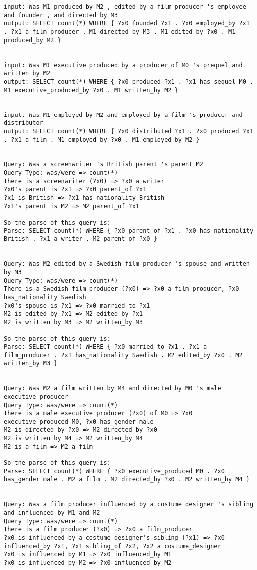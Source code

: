 \documentclass{article} \usepackage{iclr2022_conference,times}
\begin{document}
\begin{lstlisting}
input: Was M1 produced by M2 , edited by a film producer 's employee and founder , and directed by M3
output: SELECT count(*) WHERE { ?x0 founded ?x1 . ?x0 employed_by ?x1 . ?x1 a film_producer . M1 directed_by M3 . M1 edited_by ?x0 . M1 produced_by M2 }


input: Was M1 executive produced by a producer of M0 's prequel and written by M2
output: SELECT count(*) WHERE { ?x0 produced ?x1 . ?x1 has_sequel M0 . M1 executive_produced_by ?x0 . M1 written_by M2 }


input: Was M1 employed by M2 and employed by a film 's producer and distributor
output: SELECT count(*) WHERE { ?x0 distributed ?x1 . ?x0 produced ?x1 . ?x1 a film . M1 employed_by ?x0 . M1 employed_by M2 }


Query: Was a screenwriter 's British parent 's parent M2
Query Type: was/were => count(*)
There is a screenwriter (?x0) => ?x0 a writer
?x0's parent is ?x1 => ?x0 parent_of ?x1
?x1 is British => ?x1 has_nationality British
?x1's parent is M2 => M2 parent_of ?x1

So the parse of this query is:
Parse: SELECT count(*) WHERE { ?x0 parent_of ?x1 . ?x0 has_nationality British . ?x1 a writer . M2 parent_of ?x0 }


Query: Was M2 edited by a Swedish film producer 's spouse and written by M3
Query Type: was/were => count(*)
There is a Swedish film producer (?x0) => ?x0 a film_producer, ?x0 has_nationality Swedish
?x0's spouse is ?x1 => ?x0 married_to ?x1
M2 is edited by ?x1 => M2 edited_by ?x1
M2 is written by M3 => M2 written_by M3

So the parse of this query is:
Parse: SELECT count(*) WHERE { ?x0 married_to ?x1 . ?x1 a film_producer . ?x1 has_nationality Swedish . M2 edited_by ?x0 . M2 written_by M3 }


Query: Was M2 a film written by M4 and directed by M0 's male executive producer
Query Type: was/were => count(*)
There is a male executive producer (?x0) of M0 => ?x0 executive_produced M0, ?x0 has_gender male
M2 is directed by ?x0 => M2 directed_by ?x0
M2 is written by M4 => M2 written_by M4
M2 is a film => M2 a film

So the parse of this query is:
Parse: SELECT count(*) WHERE { ?x0 executive_produced M0 . ?x0 has_gender male . M2 a film . M2 directed_by ?x0 . M2 written_by M4 }


Query: Was a film producer influenced by a costume designer 's sibling and influenced by M1 and M2
Query Type: was/were => count(*)
There is a film producer (?x0) => ?x0 a film_producer
?x0 is influenced by a costume designer's sibling (?x1) => ?x0 influenced_by ?x1, ?x1 sibling_of ?x2, ?x2 a costume_designer
?x0 is influenced by M1 => ?x0 influenced_by M1
?x0 is influenced by M2 => ?x0 influenced_by M2


\end{lstlisting}
\end{document}
